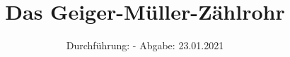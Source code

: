 

\subject{V703}
\title{Das Geiger-Müller-Zählrohr}
\date{%
  Durchführung: -
  \hspace{3em}
  Abgabe: 23.01.2021
}



\maketitle
\thispagestyle{empty}
\tableofcontents
\newpage







\printbibliography{}


